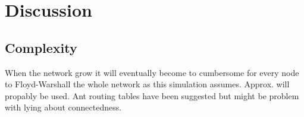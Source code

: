 \chapter{Discussion}

\section{Complexity}

When the network grow it will eventually become to cumbersome for every node to Floyd-Warshall the whole network as this simulation assumes. Approx. will propably be used. Ant routing tables have been suggested but might be problem with lying about connectedness.
